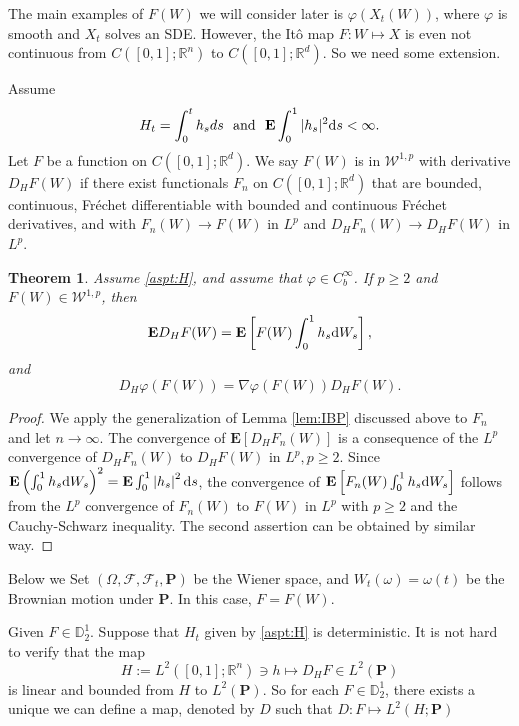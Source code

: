 \documentclass[twoside, 12pt]{book}
\numberwithin{equation}{chapter}
\newtheorem{theorem}{Theorem}[section]
\def\cF{{\mathcal F}}
\def\mD{{\mathbb D}}
\def\mR{{\mathbb R}}
\def\bE{{\mathbf E}}
\def\bP{{\mathbf P}}
\def\sW{{\mathscr W}}
\def\geq{\geqslant}
\def\d{\text{\rm{d}}}
\begin{document}
    The main examples of $F(W)$ we will consider later is $\varphi(X_t(W))$, where $\varphi$ is smooth and $X_t$ solves an SDE. However, the It\^o map $F: W\mapsto X$ is even not continuous from $C([0,1];\mR^n)$ to $C([0,1];\mR^d)$. So we need some extension. 

    \medspace
    
    Assume 
    \begin{equation}\label{aspt:H}
        H_t=\int_0^t h_s d s~ \mbox{ and }~ \bE \int_0^1 |h_s|^2 \d s <\infty. 
    \end{equation}  
    Let $F$ be a function on $C([0,1];\mR^d)$. We say $F(W)$ is in $\sW^{1,p}$ with derivative $D_{H}F(W)$ if there exist functionals $F_n$ on $C([0,1];\mR^d)$ that are bounded, continuous, Fréchet differentiable with bounded and continuous Fréchet derivatives, and with $F_n(W) \rightarrow F(W)$ in $L^p$ and $D_H F_n(W) \rightarrow D_HF(W)$ in $L^p$.       \begin{theorem}
        Assume \eqref{aspt:H}, and assume that $\varphi\in C^\infty_b$. If $p \geq 2$ and $F(W)\in \sW^{1,p}$, then 
        \[
           \mathbf{E} D_H F(W) =\mathbf{E}\left[F(W) \int_0^1 h_s \d W_s\right], 
       \]
       and 
       \[
       D_H \varphi(F(W))=\nabla \varphi(F(W))D_HF(W). 
       \]
    \end{theorem}
    \begin{proof}
        We apply the generalization of Lemma \ref{lem:IBP} discussed above to $F_n$ and let $n \rightarrow \infty$. The convergence of $\mathbf{E}\left[D_H F_n(W)\right]$ is a consequence of the $L^p$ convergence of $D_H F_n(W)$ to $D_H F(W)$ in $L^p, p \geq 2$. Since $\mathbf{E}\left(\int_0^1 h_s \d W_s\right)^2=\mathbf{E} \int_0^1\left|h_s\right|^2 \d s$, the convergence of $\mathbf{E}\left[F_n(W) \int_0^1 h_s \d W_s\right]$ follows from the $L^p$ convergence of $F_n(W)$ to $F(W)$ in $L^p$ with $p \geq 2$ and the Cauchy-Schwarz inequality. The second assertion can be obtained by similar way. 
    \end{proof}

    Below we Set $(\Omega, \cF, \cF_t, \bP)$ be the Wiener space, and $W_t(\omega)=\omega(t)$ be the Brownian motion under $\bP$. In this case, $F=F(W)$. 
    
    Given $F\in \mD^1_2$. Suppose that $H_t$ given by \eqref{aspt:H} is deterministic. It is not hard to verify that the map 
    \[
       H:=L^2([0,1];\mR^n)\ni h\mapsto D_HF \in  L^2(\bP)
    \]
    is linear and bounded from $H$ to $L^2(\bP)$. 
    So for each $F\in \mD^{1}_{2}$, there exists a unique we can define a map, denoted by $D$ such that $D: F\mapsto L^2(H; \bP)$ 
    
\end{document}
